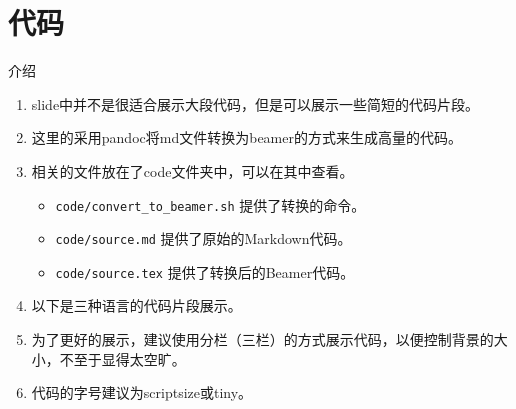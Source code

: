 \documentclass[aspectratio=169]{beamer}
\begin{document}
\section{代码}

\begin{frame}{介绍}
    \begin{enumerate}
        \item slide中并不是很适合展示大段代码，但是可以展示一些简短的代码片段。
        \item 这里的采用pandoc将md文件转换为beamer的方式来生成高量的代码。
        \item 相关的文件放在了code文件夹中，可以在其中查看。
        \begin{itemize}
            \item \texttt{code/convert\_to\_beamer.sh} 提供了转换的命令。
            \item \texttt{code/source.md} 提供了原始的Markdown代码。
            \item \texttt{code/source.tex} 提供了转换后的Beamer代码。
        \end{itemize}
        \item 以下是三种语言的代码片段展示。
        \item 为了更好的展示，建议使用分栏（三栏）的方式展示代码，以便控制背景的大小，不至于显得太空旷。
        \item 代码的字号建议为scriptsize或tiny。
    \end{enumerate}
\end{frame}
\end{document}
